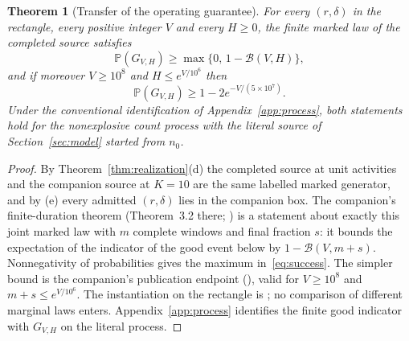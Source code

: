 \documentclass[11pt,a4paper]{article}
\theoremstyle{plain}
\newtheorem{theorem}{Theorem}[section]
\theoremstyle{definition}
\theoremstyle{remark}
\newcommand{\Prob}{\mathbb P}
\newcommand{\Good}{G_{V,H}}
\newcommand{\Bud}{\mathcal B}
\begin{document}
\begin{theorem}[Transfer of the operating guarantee]\label{thm:transfer}
For every $(r,\delta)$ in the rectangle, every positive integer $V$ and every $H\ge0$, the finite marked law of the completed source satisfies
\begin{equation}\label{eq:success}
 \Prob(\Good)\ge\max\{0,\,1-\Bud(V,H)\},
\end{equation}
and if moreover $V\ge10^8$ and $H\le e^{V/10^6}$ then
\begin{equation}\label{eq:simple}
 \Prob(\Good)\ge1-2e^{-V/(5\times10^7)} .
\end{equation}
Under the conventional identification of Appendix~\ref{app:process}, both statements hold for the nonexplosive count process with the literal source of Section~\ref{sec:model} started from $n_0$.
\end{theorem}
\begin{proof}
By Theorem~\ref{thm:realization}(d) the completed source at unit activities and the companion source at $K=10$ are the same labelled marked generator, and by (e) every admitted $(r,\delta)$ lies in the companion box. The companion's finite-duration theorem (Theorem~3.2 there; ) is a statement about exactly this joint marked law with $m$ complete windows and final fraction $s$: it bounds the expectation of the indicator of the good event below by $1-\Bud(V,m+s)$. Nonnegativity of probabilities gives the maximum in~\eqref{eq:success}. The simpler bound is the companion's publication endpoint (), valid for $V\ge10^8$ and $m+s\le e^{V/10^6}$. The instantiation on the rectangle is ; no comparison of different marginal laws enters. Appendix~\ref{app:process} identifies the finite good indicator with $\Good$ on the literal process.
\end{proof}
\end{document}
